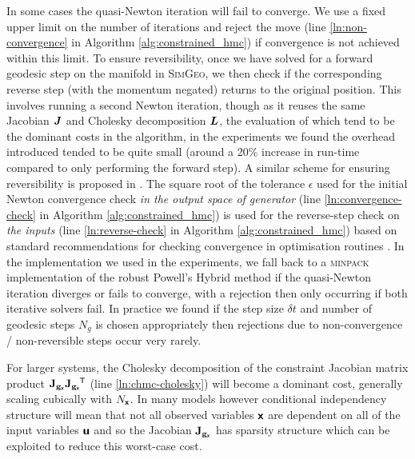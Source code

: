In some cases the quasi-Newton iteration will fail to converge. We use a fixed upper limit on the number of iterations and reject the move (line \ref{ln:non-convergence} in Algorithm \ref{alg:constrained_hmc}) if convergence is not achieved within this limit. To ensure reversibility, once we have solved for a forward geodesic step on the manifold in \textsc{SimGeo}, we then check if the corresponding reverse step (with the momentum negated) returns to the original position. This involves running a second Newton iteration, though as it reuses the same Jacobian $\boldsymbol{J}$ and Cholesky decomposition $\boldsymbol{L}$, the evaluation of which tend to be the dominant costs in the algorithm, in the experiments we found the overhead introduced tended to be quite small (around a 20\% increase in run-time compared to only performing the forward step). A similar scheme for ensuring reversibility is proposed in \citep{zappa2017monte}. The square root of the tolerance $\epsilon$ used for the initial Newton convergence check \emph{in the output space of generator} (line \ref{ln:convergence-check} in Algorithm \ref{alg:constrained_hmc}) is used for the reverse-step check on \emph{the inputs} (line \ref{ln:reverse-check} in Algorithm \ref{alg:constrained_hmc}) based on standard recommendations for checking convergence in optimisation routines \citep{christensen2008devil}. In the implementation we used in the experiments, we fall back to a \textsc{minpack} \citep{more1980user} implementation of the robust Powell's Hybrid method \citep{powell1970hybrid} if the quasi-Newton iteration diverges or fails to converge, with a rejection then only occurring if both iterative solvers fail. In practice we found if the step size $\delta t$ and number of geodesic steps $N_g$ is chosen appropriately then rejections due to non-convergence / non-reversible steps occur very rarely.

For larger systems, the Cholesky decomposition of the constraint Jacobian matrix product $\mathbf{J}_{{\mathbf{g}}_{\boldsymbol{\mathsf{x}}}}\mathbf{J}_{{\mathbf{g}}_{\boldsymbol{\mathsf{x}}}}\phantom{}^{\mkern-1.5mu\mathsf{T}}$ (line \ref{ln:chmc-cholesky}) will become a dominant cost, generally scaling cubically with $N_{\boldsymbol{\mathsf{x}}}$. In many models however conditional independency structure will mean that not all observed variables $\boldsymbol{\mathsf{x}}$ are dependent on all of the input variables $\boldsymbol{\mathsf{u}}$ and so the Jacobian $\mathbf{J}_{{\mathbf{g}}_{\boldsymbol{\mathsf{x}}}}$ has sparsity structure which can be exploited to reduce this worst-case cost. 

